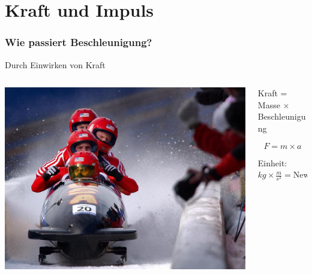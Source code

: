 \documentclass{beamer}
\begin{document}






\section{Kraft und Impuls}

\begin{frame}
\frametitle{Wie passiert Beschleunigung?}

Durch Einwirken von Kraft 

\begin{columns}[c]


\begin{column}{5cm}

\begin{center}
\includegraphics[width=\textwidth]{BobsledRun.jpg}
\end{center}


\end{column}

\begin{column}{6cm}


Kraft = Masse \(\times\) Beschleunigung 

\[F = m\times a\]

Einheit: \(kg\times\frac{m}{s^2} = \text{Newton (N)}\)


\end{column}

\end{columns}


\end{frame}
\end{document}

